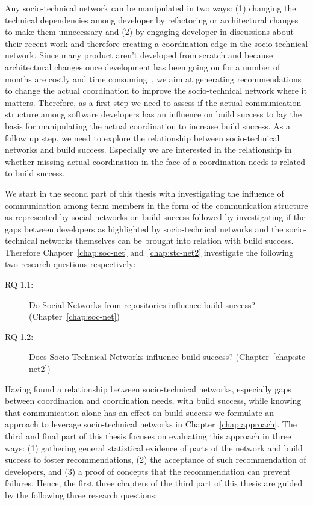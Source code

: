 Any socio-technical network can be manipulated in two ways: (1) changing the technical dependencies among developer by refactoring or architectural changes to make them unnecessary and (2) by engaging developer in discussions about their recent work and therefore creating a coordination edge in the socio-technical network.
Since many product aren't developed from scratch and because architectural changes once development has been going on for a number of months are costly and time consuming~\cite{vangurp:jss:2002}, we aim at generating recommendations to change the actual coordination to improve the socio-technical network where it matters.
Therefore, as a first step we need to assess if the actual communication structure among software developers has an influence on build success to lay the basis for manipulating the actual coordination to increase build success.
As a follow up step, we need to explore the relationship between socio-technical networks and build success.
Especially we are interested in the relationship in whether missing actual coordination in the face of a coordination needs is related to build success.

We start in the second part of this thesis with investigating the influence of communication among team members in the form of the communication structure as represented by social networks on build success followed by investigating if the gaps between developers as highlighted by socio-technical networks and the socio-technical networks themselves can be brought into relation with build success.
Therefore Chapter~\ref{chap:soc-net} and~\ref{chap:stc-net2} investigate the following two research questions respectively:

\begin{description}
  \item[RQ 1.1:] Do Social Networks from repositories influence build success? (Chapter~\ref{chap:soc-net})
  \item[RQ 1.2:] Does Socio-Technical Networks influence build success? (Chapter~\ref{chap:stc-net2})
\end{description}

Having found a relationship between socio-technical networks, especially gaps between coordination and coordination needs, with build success, while knowing that communication alone has an effect on build success we formulate an approach to leverage socio-technical networks in Chapter~\ref{chap:approach}.
The third and final part of this thesis focuses on evaluating this approach in three ways:
(1) gathering general statistical evidence of parts of the network and build success to foster recommendations,
(2) the acceptance of such recommendation of developers,
and (3) a proof of concepts that the recommendation can prevent failures.
Hence, the first three chapters of the third part of this thesis are guided by the following three research questions:

